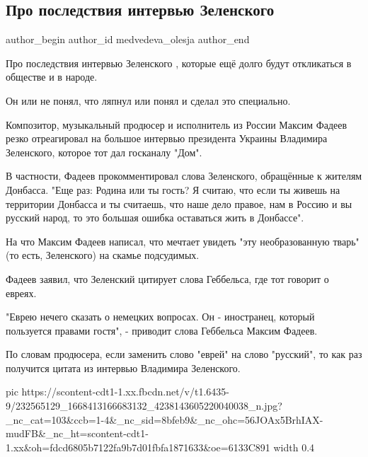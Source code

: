  
 
 
 
 
 
\subsection{Про последствия интервью Зеленского}
\label{sec:07_08_2021.fb.medvedeva_olesja.1.zelenskii_interview_fadeev}
 
\ifcmt
 author_begin
   author_id medvedeva_olesja
 author_end
\fi

Про последствия интервью Зеленского , которые ещё долго будут откликаться в
обществе и в народе.  

Он или не понял, что ляпнул или понял и сделал это специально. 

Композитор, музыкальный продюсер и исполнитель из России Максим Фадеев резко
отреагировал на большое интервью президента Украины Владимира Зеленского,
которое тот дал госканалу "Дом".

В частности, Фадеев прокомментировал слова  Зеленского, обращённые к жителям
Донбасса. "Еще раз: Родина или ты гость? Я считаю, что если ты живешь на
территории Донбасса и ты считаешь, что наше дело правое, нам в Россию и вы
русский народ, то это большая ошибка оставаться жить в Донбассе".

На что Максим Фадеев написал, что мечтает увидеть "эту необразованную тварь"
(то есть, Зеленского) на скамье подсудимых.

Фадеев заявил, что Зеленский цитирует слова Геббельса, где тот говорит о
евреях.

"Еврею нечего сказать о немецких вопросах. Он - иностранец, который пользуется
правами гостя", - приводит слова Геббельса Максим Фадеев. 

По словам продюсера, если заменить слово "еврей" на слово "русский", то как раз
получится цитата из интервью Владимира Зеленского.

\ifcmt
  pic https://scontent-cdt1-1.xx.fbcdn.net/v/t1.6435-9/232565129_1668413166683132_4238143605220040038_n.jpg?_nc_cat=103&ccb=1-4&_nc_sid=8bfeb9&_nc_ohc=56JOAx5BrhIAX-mudFB&_nc_ht=scontent-cdt1-1.xx&oh=fdcd6805b7122fa9b7d01fbfa1871633&oe=6133C891
  width 0.4
\fi

